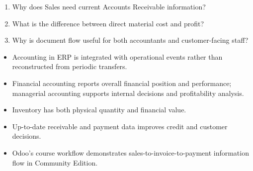 \begin{quickcheck}
\begin{enumerate}
  \item Why does Sales need current Accounts Receivable information?
  \item What is the difference between direct material cost and profit?
  \item Why is document flow useful for both accountants and customer-facing staff?
\end{enumerate}
\end{quickcheck}

\begin{chapterrecap}
\begin{itemize}
  \item Accounting in ERP is integrated with operational events rather than reconstructed from periodic transfers.
  \item Financial accounting reports overall financial position and performance; managerial accounting supports internal decisions and profitability analysis.
  \item Inventory has both physical quantity and financial value.
  \item Up-to-date receivable and payment data improves credit and customer decisions.
  \item Odoo's course workflow demonstrates sales-to-invoice-to-payment information flow in Community Edition.
\end{itemize}
\end{chapterrecap}
